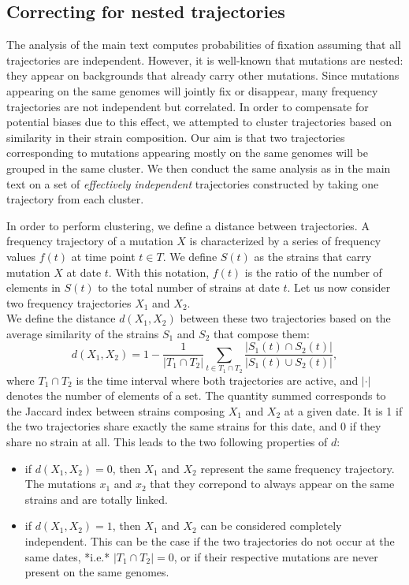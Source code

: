 \documentclass[reprint,amsmath,amssymb,superscriptaddress,showpacs,rmp]{revtex4-1}
\begin{document}
\subsection{Correcting for nested trajectories} %
\label{sub:correcting_for_nested_trajectories}

The analysis of the main text computes probabilities of fixation assuming that all trajectories are independent.
However, it is well-known that mutations are nested: they appear on backgrounds that already carry other mutations.
Since mutations appearing on the same genomes will jointly fix or disappear, many frequency trajectories are not independent but correlated.
In order to compensate for potential biases due to this effect, we attempted to cluster trajectories based on similarity in their strain composition.
Our aim is that two trajectories corresponding to mutations appearing mostly on the same genomes will be grouped in the same cluster.
We then conduct the same analysis as in the main text on a set of \emph{effectively independent} trajectories constructed by taking one trajectory from each cluster.

In order to perform clustering, we define a distance between trajectories.
A frequency trajectory of a mutation $X$ is characterized by a series of frequency values $f(t)$ at time point  $t\in T$.
We define $S(t)$ as the strains that carry mutation $X$ at date $t$.
With this notation, $f(t)$ is the ratio of the number of elements in $S(t)$ to the total number of strains at date $t$.
Let us now consider two frequency trajectories $X_1$ and $X_2$. \\
We define the distance $d(X_1,X_2)$ between these two trajectories based on the average similarity of the strains $S_1$ and $S_2$ that compose them:
$$ d(X_1,X_2) = 1 - \frac{1}{\vert T_1\cap T_2\vert}\sum_{t\in T_1\cap T_2} \frac{\vert S_1(t)\cap S_2(t)\vert}{\vert S_1(t)\cup S_2(t)\vert}, $$
where $T_1\cap T_2$ is the time interval where both trajectories are active, and $\vert\cdot\vert$ denotes the number of elements of a set.
The quantity summed corresponds to the Jaccard index between strains composing $X_1$ and $X_2$ at a given date.
It is 1 if the two trajectories share exactly the same strains for this date, and 0 if they share no strain at all.
This leads to the two following properties of $d$:
\begin{itemize}
	\item if $d(X_1,X_2)=0$, then $X_1$ and $X_2$ represent the same frequency trajectory. The mutations $x_1$ and $x_2$ that they correpond to always appear on the same strains and are totally linked.
	\item if $d(X_1,X_2)=1$, then $X_1$ and $X_2$ can be considered completely independent. This can be the case if the two trajectories do not occur at the same dates, *i.e.* $\vert T_1\cap T_2\vert=0$, or if their respective mutations are never present on the same genomes.
\end{itemize}
\end{document}
